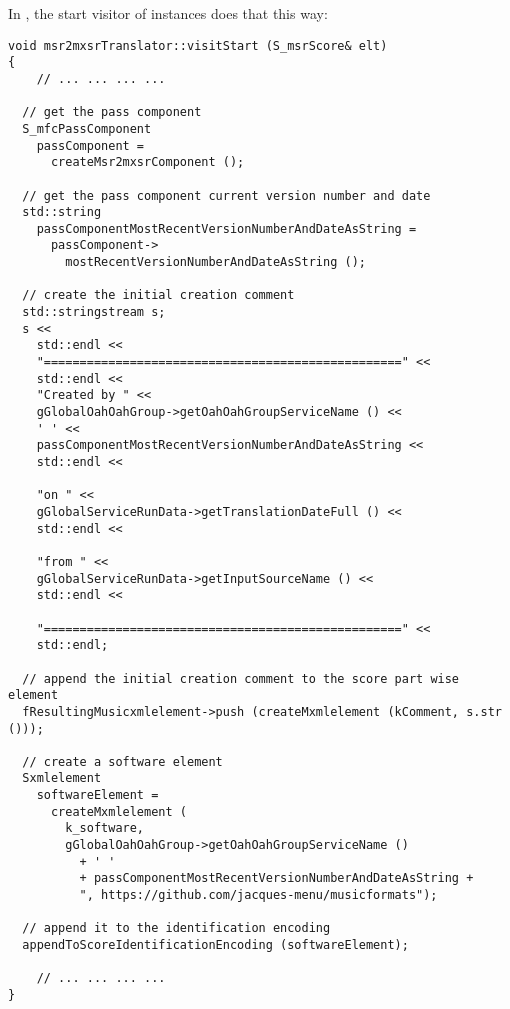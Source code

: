 In , the start visitor of  instances does that this way:
\begin{lstlisting}[language=CPlusPlus]
void msr2mxsrTranslator::visitStart (S_msrScore& elt)
{
 	// ... ... ... ...

  // get the pass component
  S_mfcPassComponent
    passComponent =
      createMsr2mxsrComponent ();

  // get the pass component current version number and date
  std::string
    passComponentMostRecentVersionNumberAndDateAsString =
      passComponent->
        mostRecentVersionNumberAndDateAsString ();

  // create the initial creation comment
  std::stringstream s;
  s <<
    std::endl <<
    "==================================================" <<
    std::endl <<
    "Created by " <<
    gGlobalOahOahGroup->getOahOahGroupServiceName () <<
    ' ' <<
    passComponentMostRecentVersionNumberAndDateAsString <<
    std::endl <<

    "on " <<
    gGlobalServiceRunData->getTranslationDateFull () <<
    std::endl <<

    "from " <<
    gGlobalServiceRunData->getInputSourceName () <<
    std::endl <<

    "==================================================" <<
    std::endl;

  // append the initial creation comment to the score part wise element
  fResultingMusicxmlelement->push (createMxmlelement (kComment, s.str ()));

  // create a software element
  Sxmlelement
    softwareElement =
      createMxmlelement (
        k_software,
        gGlobalOahOahGroup->getOahOahGroupServiceName ()
          + ' '
          + passComponentMostRecentVersionNumberAndDateAsString +
          ", https://github.com/jacques-menu/musicformats");

  // append it to the identification encoding
  appendToScoreIdentificationEncoding (softwareElement);

 	// ... ... ... ...
}
\end{lstlisting}

